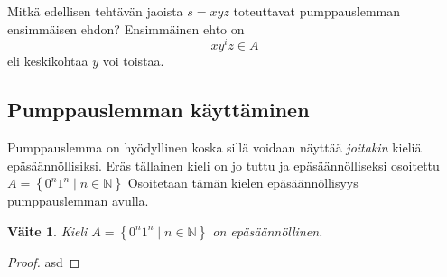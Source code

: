 \documentclass[a4paper,11pt]{article}
\newtheorem*{claim}{Väite}
\theoremstyle{definition}
\newcommand{\set}[1]{{\left\{ #1 \right\}}}
\newcommand{\Nat}{\mathbb{N}}
\begin{document}
\begin{exercise}
    Mitkä edellisen tehtävän jaoista $s = xyz$ toteuttavat pumppauslemman
    ensimmäisen ehdon? Ensimmäinen ehto on
    \begin{equation*}
        xy^iz \in A
    \end{equation*}
    eli keskikohtaa $y$ voi toistaa.
\end{exercise}

\subsection*{Pumppauslemman käyttäminen}

Pumppauslemma on hyödyllinen koska sillä voidaan näyttää \emph{joitakin} kieliä
epäsäännöllisiksi. Eräs tällainen kieli on jo tuttu ja epäsäännölliseksi
osoitettu $A = \set{0^n1^n \mid n \in \Nat}$  Osoitetaan tämän kielen
epäsäännöllisyys pumppauslemman avulla.
%
\begin{claim}
    Kieli $A = \set{0^n1^n \mid n \in \Nat}$ on epäsäännöllinen.
\end{claim}
\begin{proof}
    asd
\end{proof}
\end{document}
